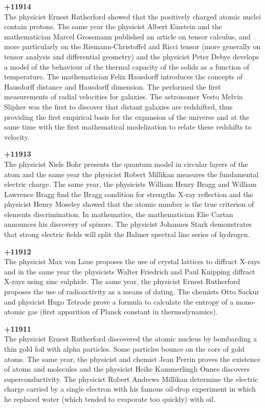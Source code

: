 \textbf{+11914}\\
The physicist Ernest Rutherford showed that the positively charged atomic nuclei contain protons. The same year the physicist Albert Einstein and the mathematician Marcel Grossmann published an article on tensor calculus, and more particularly on the Riemann-Christoffel and Ricci tensor (more generally on tensor analysis and differential geometry) and the physicist Peter Debye develops a model of the behaviour of the thermal capacity of the solids as a function of temperature. The mathematician Felix Hausdorff introduces the concepts of Hausdorff distance and Hausdorff dimension. The performed the first measurements of radial velocities for galaxies. The astronomer Vesto Melvin Slipher was the first to discover that distant galaxies are redshifted, thus providing the first empirical basis for the expansion of the universe and at the same time with the first mathematical modelization to relate these redshifts to velocity.

\textbf{+11913}\\
The physicist Niels Bohr presents the quantum model in circular layers of the atom and the same year the physicist Robert Millikan measures the fundamental electric charge. The same year, the physicists William Henry Bragg and William Lawrence Bragg find the Bragg condition for strengths X-ray reflection and the physicist Henry Moseley showed that the atomic number is the true criterion of elements discrimination. In mathematics, the mathematician Elie Cartan announces his discovery of spinors. The physicist Johannes Stark demonstrates that strong electric fields will split the Balmer spectral line series of hydrogen.

\textbf{+11912}\\
The physicist Max von Laue proposes the use of crystal lattices to diffract X-rays and in the same year the physicists Walter Friedrich and Paul Knipping diffract X-rays using zinc sulphide. The same year, the physicist Ernest Rutherford proposes the use of radioactivity as a means of dating. The chemists Otto Sackur and physicist Hugo Tetrode prove a formula to calculate the entropy of a mono-atomic gas (first apparition of Planck constant in thermodynamics).

\textbf{+11911}\\
The physicist Ernest Rutherford discovered the atomic nucleus by bombarding a thin gold foil with alpha particles. Some particles bounce on the core of gold atoms. The same year, the physicist and chemist Jean Perrin proves the existence of atoms and molecules and the physicist Heike Kammerlingh Onnes discovers superconductivity. The physicist Robert Andrews Millikan determine the electric charge carried by a single electron with his famous oil-drop experiment in which he replaced water (which tended to evaporate too quickly) with oil.

